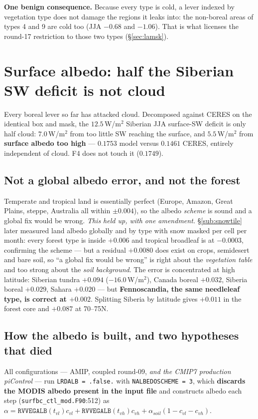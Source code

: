 \documentclass[10pt]{article}
\begin{document}
\textbf{One benign consequence.} Because every type is cold, a lever indexed by vegetation type
does not damage the regions it leaks into: the non-boreal areas of types 4 and 9 are cold too
(JJA $-0.68$ and $-1.06$). That is what licenses the round-17 restriction to those two types
(\S\ref{sec:lamsk}).

\section{Surface albedo: half the Siberian SW deficit is not cloud}\label{sec:albedo}
Every boreal lever so far has attacked cloud. Decomposed against CERES on the identical box
and mask, the $12.5$\,W/m$^2$ Siberian JJA surface-SW deficit is only half cloud:
$\mathbf{7.0}$\,W/m$^2$ from too little SW reaching the surface, and
$\mathbf{5.5}$\,W/m$^2$ from \textbf{surface albedo too high} --- $0.1753$ model versus
$0.1461$ CERES, entirely independent of cloud. F4 does not touch it ($0.1749$).

\subsection{Not a global albedo error, and not the forest}\label{sub:albreg}
Temperate and tropical land is essentially perfect (Europe, Amazon, Great Plains, steppe,
Australia all within $\pm0.004$), so the albedo \emph{scheme} is sound and a global fix would
be wrong. \emph{This held up, with one amendment.} \S\ref{sub:snowtile} later measured land
albedo globally and by type with snow masked per cell per month: every forest type is inside
$+0.006$ and tropical broadleaf is at $-0.0003$, confirming the scheme --- but a residual
$+0.0080$ does exist on crops, semidesert and bare soil, so ``a global fix would be wrong''
is right about the \emph{vegetation table} and too strong about the \emph{soil background}.
The error is concentrated at high latitude: Siberian tundra $+0.094$ ($-16.0$\,W/m$^2$),
Canada boreal $+0.032$, Siberia boreal $+0.029$, Sahara $+0.020$ --- but \textbf{Fennoscandia,
the same needleleaf type, is correct at $+0.002$}. Splitting Siberia by latitude gives $+0.011$
in the forest core and $+0.087$ at 70--75N.

\subsection{How the albedo is built, and two hypotheses that died}\label{sub:albbuild}
All configurations --- AMIP, coupled round-09, \emph{and the CMIP7 production piControl} ---
run \texttt{LRDALB = .false.} with \texttt{NALBEDOSCHEME = 3}, which \textbf{discards the MODIS
albedo present in the input file} and constructs albedo each step
(\texttt{surfbc\_ctl\_mod.F90}:512) as
$\alpha=\mathtt{RVVEGALB}(t_{vl})c_{vl}+\mathtt{RVVEGALB}(t_{vh})c_{vh}+\alpha_{soil}(1-c_{vl}-c_{vh})$.
\end{document}
